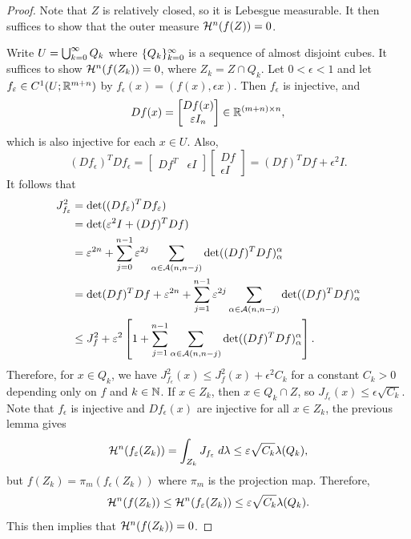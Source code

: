 \documentclass[a4paper]{article}
\begin{document}
\begin{proof}
Note that $Z$ is relatively closed, so it is Lebesgue
measurable. It then suffices to show that the outer
measure $\mathcal{H}^n (f(Z)) = 0$.

Write $U = \bigcup_{k=0}^\infty Q_k$ where $\{ Q_k \}_{k=0}^\infty$ is
a sequence of almost disjoint cubes. It suffices to show
$\mathcal{H}^n (f(Z_k)) = 0$, where $Z_k = Z \cap Q_k$.
Let $0 < \epsilon < 1$ and let $f_\varepsilon \in C^1 (U;
\mathbb{R}^{m+n})$ by $f_\epsilon(x) = (f(x), \epsilon x)$.
Then $f_\epsilon$ is injective, and
\[
Df(x) = \begin{bmatrix}
  Df(x) \\
  \varepsilon I_n
\end{bmatrix}
\in \mathbb{R}^{(m + n) \times n},
\]
which is also injective for each $x \in U$. Also,
\[
(Df_\epsilon)^T Df_\epsilon =
\begin{bmatrix}
  Df^T & \epsilon I
\end{bmatrix}
\begin{bmatrix}
  Df \\
  \epsilon I
\end{bmatrix}
= (Df)^T Df + \epsilon^2 I.
\]
It follows that
\[
\begin{aligned}
  J_{f_\varepsilon}^2
  &= \det((Df_\varepsilon)^T Df_\varepsilon) \\
  &= \det(\varepsilon^2 I + (Df)^T Df) \\
  &= \varepsilon^{2n} + \sum_{j=0}^{n-1} \varepsilon^{2j}
  \sum_{\alpha \in \mathcal{A}(n, n - j)} \det((Df)^T Df)_\alpha^\alpha \\
  &= \det (Df)^T Df + \varepsilon^{2n}
  + \sum_{j=1}^{n-1} \varepsilon^{2j} \sum_{\alpha \in \mathcal{A}(n, n-j)}
  \det((Df)^T Df)_\alpha^\alpha \\
  &\leq J_f^2 + \varepsilon^2 \left[ 1 +
  \sum_{j=1}^{n-1} \sum_{\alpha \in \mathcal{A}(n, n-j)}
  \det((Df)^T Df)_\alpha^\alpha \right].
\end{aligned}
\]
Therefore, for $x \in Q_k$, we have $J_{f_\epsilon}^2 (x)
\leq J_f^2(x) + \epsilon^2 C_k$ for a constant
$C_k > 0$ depending only on $f$ and $k \in \mathbb{N}$.
If $x \in Z_k$, then $x \in Q_k \cap Z$, so
$J_{f_\epsilon} (x) \leq \epsilon \sqrt{C_k}$.
Note that $f_\epsilon$ is injective and
$Df_\epsilon(x)$ are injective for all $x \in Z_k$,
the previous lemma gives
\[
\mathcal{H}^n (f_\varepsilon(Z_k))
= \int_{Z_k} J_{f_\varepsilon} \; d \lambda
\leq \varepsilon \sqrt{C_k} \lambda(Q_k),
\]
but $f(Z_k) = \pi_{m} (f_\epsilon (Z_k))$ where
$\pi_m$ is the projection map. Therefore,
\[
\mathcal{H}^n (f(Z_k)) \leq \mathcal{H}^n (f_\varepsilon (Z_k))
\leq \varepsilon \sqrt{C_k} \lambda (Q_k).
\]
This then implies that $\mathcal{H}^n(f(Z_k)) = 0$.
\end{proof}
\end{document}
